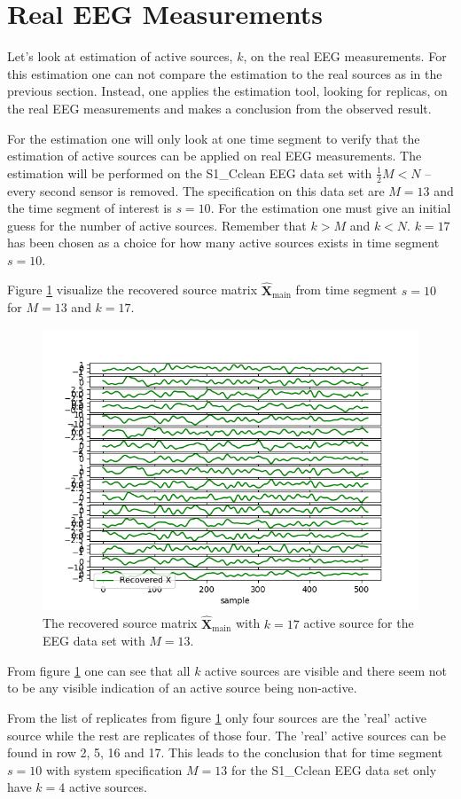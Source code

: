 \section{Real EEG Measurements}
Let's look at estimation of active sources, $k$, on the real EEG measurements. 
For this estimation one can not compare the estimation to the real sources as in the previous section.
Instead, one applies the estimation tool, looking for replicas, on the real EEG measurements and makes a conclusion from the observed result.

For the estimation one will only look at one time segment to verify that the estimation of active sources can be applied on real EEG measurements. 
The estimation will be performed on the S1\_Cclean EEG data set with $\frac{1}{2} M < N$ -- every second sensor is removed. 
The specification on this data set are $M = 13$ and the time segment of interest is $s = 10$. 
For the estimation one must give an initial guess for the number of active sources. 
Remember that $k > M$ and $k < N$.  
$k = 17$ has been chosen as a choice for how many active sources exists in time segment $s = 10$. 

Figure \ref{fig:eeg_k} visualize the recovered source matrix $\hat{\mathbf{X}}_{\text{main}}$ from time segment $s = 10$ for $M = 13$ and $k = 17$.
\begin{figure}[H]
    \centering
	\includegraphics[scale=0.5]{figures/ch_estimate/eeg_k_timeseg_10.png}
	\caption{The recovered source matrix $\hat{\mathbf{X}}_{\text{main}}$ with $k = 17$ active source for the EEG data set with $M = 13$.}
	\label{fig:eeg_k}
\end{figure}
\noindent
From figure \ref{fig:eeg_k} one can see that all $k$ active sources are visible and there seem not to be any visible indication of an active source being non-active. 

From the list of replicates from figure \ref{fig:eeg_k} only four sources are the 'real' active source while the rest are replicates of those four. 
The 'real' active sources can be found in row 2, 5, 16 and 17. 
This leads to the conclusion that for time segment $s = 10$ with system specification $M = 13$ for the S1\_Cclean EEG data set only have $k = 4$ active sources.



